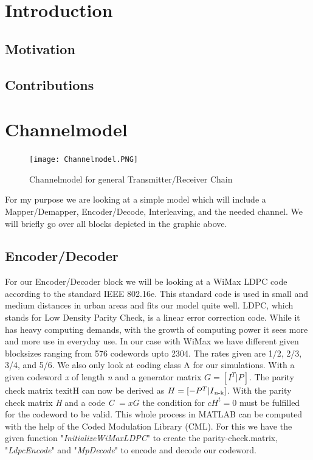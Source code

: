 \documentclass[12pt,oneside, reqno]{report}
\begin{document}
\newpage
{}
\listoffigures

%

\newpage
\thispagestyle{empty}
\null
\newpage
\chapter{Introduction}
\section{Motivation}
\section{Contributions}

\newpage
\chapter{Channelmodel}
\begin{figure}[H]
	\centering
	\texttt{[image: Channelmodel.PNG]}
	\caption{Channelmodel for general Transmitter/Receiver Chain}
	\label{fig:Channelmodel}
\end{figure}

For my purpose we are looking at a simple model which will include a Mapper/Demapper, Encoder/Decode, Interleaving, and the needed channel. We will briefly go over all blocks depicted in the graphic above.

\section{Encoder/Decoder}

For our Encoder/Decoder block we will be looking at a WiMax LDPC code according to the standard IEEE 802.16e. This standard code is used in small and medium distances in urban areas and fits our model quite well. LDPC, which stands for Low Density Parity Check, is a linear error correction code. While it has heavy computing demands, with the growth of computing power it sees more and more use in everyday use. In our case with WiMax we have different given blocksizes ranging from 576 codewords upto 2304. The rates given are 1/2, 2/3, 3/4, and 5/6. We also only look at coding class A for our simulations. 
With a given codeword \textit{x} of length \textit{n} and a generator matrix $G = [I^T|P]$. The parity check matrix texit{H} can now be derived as $H = [-P^T|I\textsubscript{n-k}]$. With the parity check matrix \textit{H} and a code \textit{C} $= xG$ the condition for $cH^t = 0$ must be fulfilled for the codeword to be valid.  
This whole process in MATLAB can be computed with the help of the Coded Modulation Library (CML). For this we have the given function "\textit{InitializeWiMaxLDPC}" to create the parity-check.matrix, "\textit{LdpcEncode}" and "\textit{MpDecode}" to encode and decode our codeword.
\end{document}
